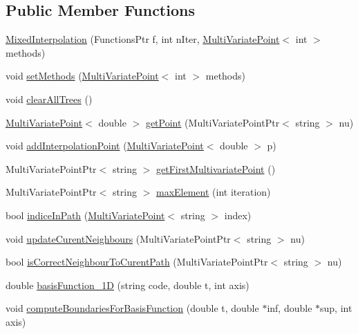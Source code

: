 \subsection*{Public Member Functions}
\begin{DoxyCompactItemize}
\item 
\hyperlink{class_mixed_interpolation_a5cf10a29fd266fe64811b2898b71af32}{Mixed\+Interpolation} (Functions\+Ptr f, int n\+Iter, \hyperlink{class_multi_variate_point}{Multi\+Variate\+Point}$<$ int $>$ methods)
\item 
void \hyperlink{class_mixed_interpolation_a269665fad93a49651d2d519d581efd49}{set\+Methods} (\hyperlink{class_multi_variate_point}{Multi\+Variate\+Point}$<$ int $>$ methods)
\item 
void \hyperlink{class_mixed_interpolation_a665be96aea549b82d877d1fc8eff1a9b}{clear\+All\+Trees} ()
\item 
\hyperlink{class_multi_variate_point}{Multi\+Variate\+Point}$<$ double $>$ \hyperlink{class_mixed_interpolation_a545bde4e4c83d9806fd08a6891b07af7}{get\+Point} (Multi\+Variate\+Point\+Ptr$<$ string $>$ nu)
\item 
void \hyperlink{class_mixed_interpolation_a51027c6018481bbfa4102901575e32ee}{add\+Interpolation\+Point} (\hyperlink{class_multi_variate_point}{Multi\+Variate\+Point}$<$ double $>$ p)
\item 
Multi\+Variate\+Point\+Ptr$<$ string $>$ \hyperlink{class_mixed_interpolation_a508361e1615e4fb3e77c702617637d6d}{get\+First\+Multivariate\+Point} ()
\item 
Multi\+Variate\+Point\+Ptr$<$ string $>$ \hyperlink{class_mixed_interpolation_a45908a6d89efe869a2b80d9f50264f7f}{max\+Element} (int iteration)
\item 
bool \hyperlink{class_mixed_interpolation_a5009f0fbe969538db58d5fa2f9997e4f}{indice\+In\+Path} (\hyperlink{class_multi_variate_point}{Multi\+Variate\+Point}$<$ string $>$ index)
\item 
void \hyperlink{class_mixed_interpolation_af5bbe4c2c6383989d3869f76ca6467c9}{update\+Curent\+Neighbours} (Multi\+Variate\+Point\+Ptr$<$ string $>$ nu)
\item 
bool \hyperlink{class_mixed_interpolation_af507dcd64c768b97c0ba2ff378a14f91}{is\+Correct\+Neighbour\+To\+Curent\+Path} (Multi\+Variate\+Point\+Ptr$<$ string $>$ nu)
\item 
double \hyperlink{class_mixed_interpolation_a97c5b558e53a5c98ed17d3fad6bb40ad}{basis\+Function\+\_\+1D} (string code, double t, int axis)
\item 
void \hyperlink{class_mixed_interpolation_a11a20252cbe44536f5be6024b348d755}{compute\+Boundaries\+For\+Basis\+Function} (double t, double $\ast$inf, double $\ast$sup, int axis)
\end{DoxyCompactItemize}
